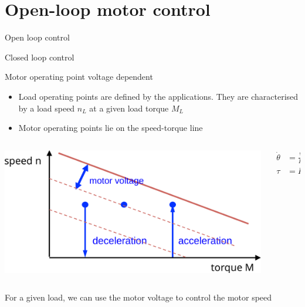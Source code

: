 \documentclass[compress]{beamer}
\begin{document}
\section[Open-loop control]{Open-loop motor control}

{
    \begin{frame}{Open loop control}
    \end{frame}
}
{
    \begin{frame}{Closed loop control}
    \end{frame}
}

\begin{frame}{Motor operating point voltage dependent}

    \begin{itemize}
        \item Load operating points are defined by the
            applications. They are characterised by a load speed $n_L$ at a
            given load torque $M_L$
        \item Motor operating points lie on the speed-torque line
    \end{itemize}

    \begin{columns}
        \begin{column}{0.6\linewidth}
    \begin{center}
        \includegraphics[width=\linewidth]{../part3/figs/operating-points}
    \end{center}
            
        \end{column}
        \begin{column}{0.4\linewidth}

    \begin{align*}
        \dot\theta &= \frac{V}{K} - R \cdot \frac{\tau}{K^2} \\
        \tau &= K \cdot I
    \end{align*}

        \end{column}
    \end{columns}


    For a given load, we can use the motor voltage to control the motor speed
\end{frame}
\end{document}
